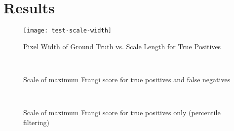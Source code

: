 \section{Results}




\begin{figure}[p]
  \texttt{[image: test-scale-width]}
  \caption{Pixel Width of Ground Truth vs. Scale Length for True Positives}
\end{figure}

\begin{figure}[p]\centering
  \\[-0.5cm]
  \caption{Scale of maximum Frangi score for true positives and false negatives}
\end{figure}

\begin{figure}[p]\centering
  \\[-0.5cm]
  \caption{Scale of maximum Frangi score for true positives only (percentile filtering)}
\end{figure}
